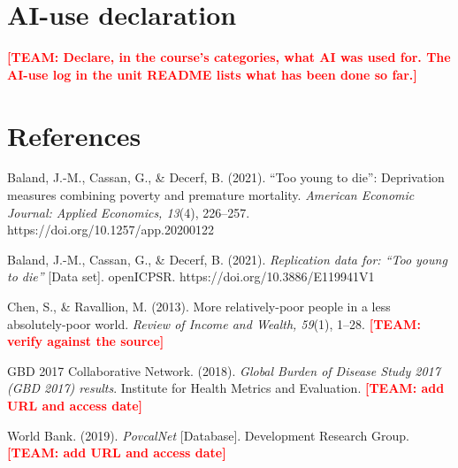 \documentclass[12pt,a4paper]{article}
\newcommand{\todo}[1]{\textbf{\textcolor{red}{[TEAM: #1]}}}
\begin{document}
\section*{AI-use declaration}
\todo{Declare, in the course's categories, what AI was used for. The AI-use log in the unit README lists what has been done so far.}

\section*{References}
\hangindent=0.5in\noindent Baland, J.-M., Cassan, G., \& Decerf, B. (2021). ``Too young to die'': Deprivation measures combining poverty and premature mortality. \emph{American Economic Journal: Applied Economics, 13}(4), 226--257. https://doi.org/10.1257/app.20200122

\hangindent=0.5in\noindent Baland, J.-M., Cassan, G., \& Decerf, B. (2021). \emph{Replication data for: ``Too young to die''} [Data set]. openICPSR. https://doi.org/10.3886/E119941V1

\hangindent=0.5in\noindent Chen, S., \& Ravallion, M. (2013). More relatively-poor people in a less absolutely-poor world. \emph{Review of Income and Wealth, 59}(1), 1--28. \todo{verify against the source}

\hangindent=0.5in\noindent GBD 2017 Collaborative Network. (2018). \emph{Global Burden of Disease Study 2017 (GBD 2017) results}. Institute for Health Metrics and Evaluation. \todo{add URL and access date}

\hangindent=0.5in\noindent World Bank. (2019). \emph{PovcalNet} [Database]. Development Research Group. \todo{add URL and access date}
\end{document}

